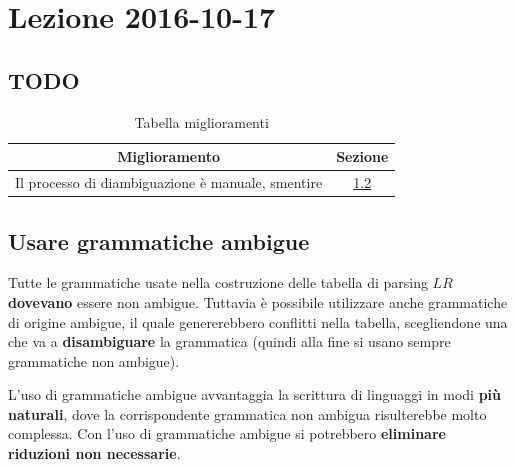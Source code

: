 \section{Lezione 2016-10-17}
\subsection{TODO}
\begin{table}[ht]
\begin{center}
\begin{tabular}{|p{\textwidth}|c|}
\hline
\multicolumn{1}{|c|}{\textbf{Miglioramento}} & \textbf{Sezione} \\ \hline
Il processo di diambiguazione \`e manuale, smentire &
\ref{sec:use_ambiguos_grammar} \\ \hline
\end{tabular}
\end{center}
\caption{Tabella miglioramenti}
\label{tab:tab_todo}
\end{table}

\subsection{Usare grammatiche ambigue}
\label{sec:use_ambiguos_grammar}
Tutte le grammatiche usate nella costruzione delle tabella di parsing $LR$
\textbf{dovevano} essere non ambigue. Tuttavia \`e possibile utilizzare anche
grammatiche di origine ambigue, il quale genererebbero conflitti nella tabella,
scegliendone una che va a \textbf{disambiguare} la grammatica (quindi alla fine
si usano sempre grammatiche non ambigue).

L'uso di grammatiche ambigue avvantaggia la scrittura di linguaggi in modi
\textbf{pi\`u naturali}, dove la corrispondente grammatica non ambigua
risulterebbe molto complessa. Con l'uso di grammatiche ambigue si potrebbero
\textbf{eliminare riduzioni non necessarie}.

